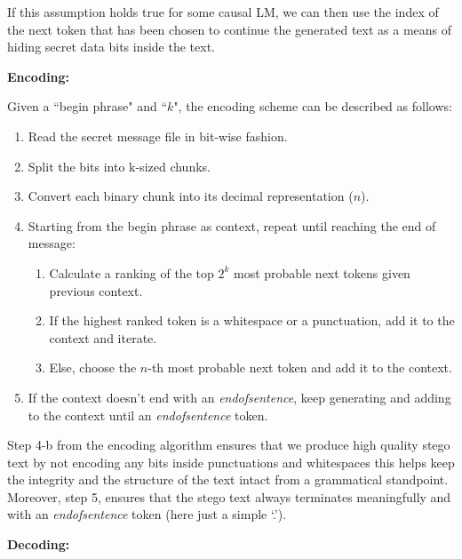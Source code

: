 \documentclass[journal,onecolumn]{IEEEtran}
\begin{document}
If this assumption holds true for some causal LM, we can then use the index of the next token
that has been chosen to continue the generated text as a means of hiding secret data bits inside the text.

\bigskip
\noindent\textbf{Encoding:}

Given a ``begin phrase" and ``$k$", the encoding scheme can be described as follows:
\begin{enumerate}
  \item Read the secret message file in bit-wise fashion.
  \item Split the bits into k-sized chunks.
  \item Convert each binary chunk into its decimal representation ($n$).
  \item Starting from the begin phrase as context, repeat until reaching the end of message:
  \begin{enumerate}
    \item Calculate a ranking of the top $2^k$ most probable next tokens given previous context.
    \item If the highest ranked token is a whitespace or a punctuation, add it to the context and iterate.
    \item Else, choose the $n$-th most probable next token and add it to the context.
  \end{enumerate}
  \item If the context doesn't end with an \textit{endofsentence}, keep generating and adding to the context until an \textit{endofsentence} token.
\end{enumerate} 

Step 4-b from the encoding algorithm ensures that we produce high quality stego text by not encoding any bits inside punctuations and whitespaces
this helps keep the integrity and the structure of the text intact from a grammatical standpoint.
Moreover, step 5, ensures that the stego text always terminates meaningfully and with an \textit{endofsentence} token (here just a simple `.').

\bigskip
\noindent\textbf{Decoding:}
\end{document}
